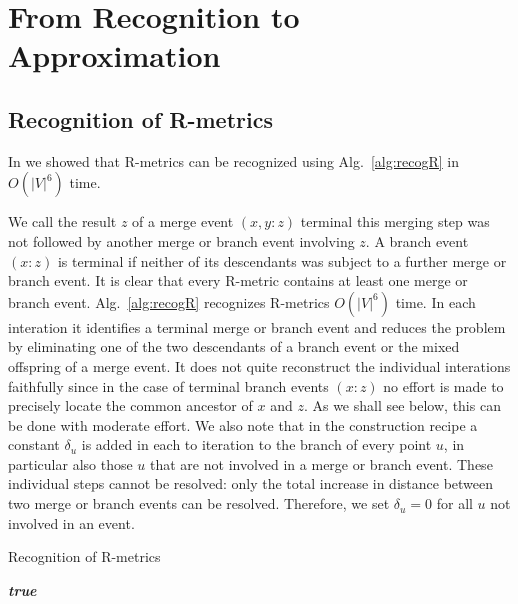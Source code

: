 \documentclass{article}
\newcommand{\TODO}[1]{\begingroup\color{red}#1\endgroup}
\begin{document}
\section{From Recognition to Approximation} 

\subsection{Recognition of R-metrics}

In \cite{Prohaska:17a} we showed that R-metrics can be recognized using
Alg.~\ref{alg:recogR} in $O(|V|^6)$ time.

We call the result $z$ of a merge event $(x,y:z)$ terminal this merging
step was not followed by another merge or branch event involving $z$. A
branch event $(x:z)$ is terminal if neither of its descendants was subject
to a further merge or branch event. It is clear that every R-metric
contains at least one merge or branch event. Alg.~\ref{alg:recogR}
\cite{Prohaska:17a} recognizes R-metrics $O(|V|^6)$ time. In each
interation it identifies a terminal merge or branch event and reduces the
problem by eliminating one of the two descendants of a branch event or the
mixed offspring of a merge event. It does not quite reconstruct the
individual interations faithfully since in the case of terminal branch
events $(x:z)$ no effort is made to precisely locate the common ancestor of
$x$ and $z$. As we shall see below, this can be done with moderate effort.
We also note that in the construction recipe a constant $\delta_u$ is added
in each to iteration to the branch of every point $u$, in particular also
those $u$ that are not involved in a merge or branch event. These
individual steps cannot be resolved: only the total increase in distance
between two merge or branch events can be resolved. Therefore, we set
$\delta_u=0$ for all $u$ not involved in an event. 

\begin{algorithm}[H]
\caption{Recognition of R-metrics}
\label{alg:recogR}
\SetAlgoLined

\Return \emph{\textbf{true}}
\end{algorithm}
\end{document}
